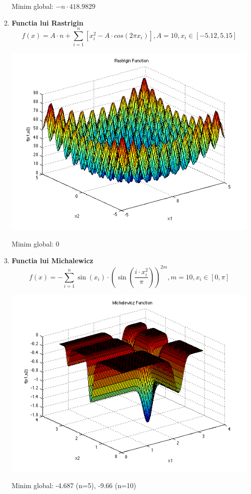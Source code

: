 \documentclass{article}
\begin{document}
\begin{enumerate}
Minim global: $-n \cdot 418.9829$
\item \textbf{Functia lui Rastrigin}
$$ f(x) = A \cdot n + \sum_{i=1}^n \left[ x_i^2 - A \cdot cos(2 \pi x_i) \right],
A = 10, x_i \in \left[ -5.12, 5.15 \right]$$

\includegraphics[scale=0.4]{rastr.png}

Minim global: 0
\item \textbf{Functia lui Michalewicz}
$$ f(x) = -\sum_{i=1}^n \sin (x_i) \cdot \left( \sin \left( \frac{i \cdot x_i^{2}}{\pi} \right) \right)  ^{2m},
m = 10, x_i \in \left[ 0, \pi \right] $$

\includegraphics[scale=0.4]{michal.png}

Minim global: -4.687 (n=5), -9.66 (n=10)
\end{enumerate}
\end{document}
